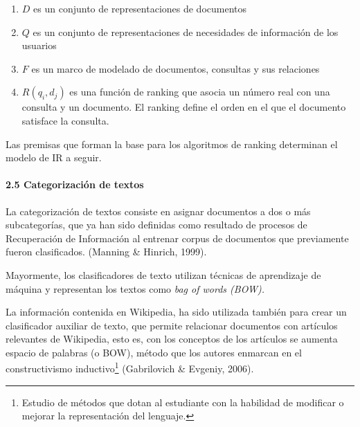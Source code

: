 \documentclass[letterpaper]{article}
\newcommand\liststyleWWviiiNumiii{%
\renewcommand\theenumi{\arabic{enumi}}
\renewcommand\theenumii{\arabic{enumii}}
\renewcommand\theenumiii{\arabic{enumiii}}
\renewcommand\theenumiv{\arabic{enumiv}}
\renewcommand\labelenumi{(\theenumi)}
\renewcommand\labelenumii{\theenumii.}
\renewcommand\labelenumiii{\theenumiii.}
\renewcommand\labelenumiv{\theenumiv.}
}
\begin{document}
\bigskip

\liststyleWWviiiNumiii
\begin{enumerate}
\item {\sffamily
 $D$ es un conjunto de representaciones de documentos }
\item {\sffamily
 $Q$ es un conjunto de representaciones de necesidades de informaci\'on
de los usuarios}
\item {\sffamily
 $F$ es un marco de modelado de documentos, consultas y sus relaciones}
\item {\sffamily
 $R(q_{i},d_{j})$  es una funci\'on de ranking que asocia un n\'umero
real con una consulta y un documento. El ranking define el orden en el
que el documento satisface la consulta.}
\end{enumerate}

\bigskip

{\sffamily
Las premisas que forman la base para los algoritmos de ranking
determinan el modelo de IR a seguir.}


\bigskip

\paragraph{2.5 Categorizaci\'on de textos}

\bigskip

{\sffamily
La categorizaci\'on de textos consiste en asignar documentos a dos o
m\'as subcategor\'ias, que ya han sido definidas como resultado de
procesos de Recuperaci\'on de Informaci\'on al entrenar corpus de
documentos que previamente fueron clasificados. (Manning \& Hinrich,
1999).}


\bigskip

{\sffamily
Mayormente, los clasificadores de texto utilizan t\'ecnicas de
aprendizaje de m\'aquina y representan los textos como \textit{bag of
words (BOW).}}


\bigskip

{\sffamily
La informaci\'on contenida en Wikipedia, ha sido utilizada tambi\'en
para crear un clasificador auxiliar de texto, que permite relacionar
documentos con art\'iculos relevantes de Wikipedia, esto es, con los
conceptos de los art\'iculos se aumenta espacio de palabras (o BOW),
m\'etodo que los autores enmarcan en el constructivismo
inductivo\footnote{Estudio de m\'etodos que dotan al estudiante con la
habilidad de modificar o mejorar la representaci\'on del lenguaje.}
(Gabrilovich \& Evgeniy, 2006).}
\end{document}
